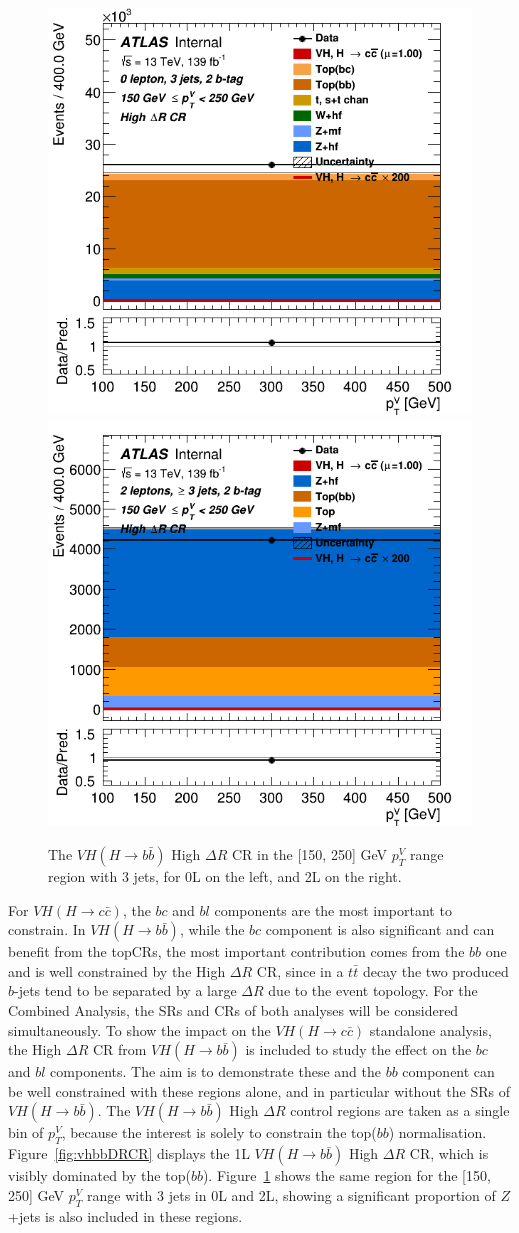 \begin{figure}[h!]
\center
\includegraphics[width=0.48\textwidth25]{Images/VH/SRsandTopCRs/Region_distpTV_DCRHigh_BMax250_L0_Y6051_TTypebb_T2_J3_BMin150_Prefit.png}
\includegraphics[width=0.48\textwidth25]{Images/VH/SRsandTopCRs/Region_distpTV_DCRHigh_BMax250_BMin150_Y6051_TTypebb_T2_J3_L2_incJet1_Prefit.png}
\caption{The $VH(H\rightarrow b\bar{b})$ High $\Delta R$ CR in the [150, 250] GeV $p_T^V$ range region with 3 jets, for 0L on the left, and 2L on the right.} 
\label{fig:vhbbDRCR02L}
\end{figure}

For $VH(H\rightarrow c\bar{c})$, the $bc$ and $bl$ components are the most important to constrain. In $VH(H\rightarrow b\bar{b})$, while the $bc$ component is also significant and can benefit from the topCRs, the most important contribution comes from the $bb$ one and is well constrained by the High $\Delta R$ CR, since in a $t\bar{t}$ decay the two produced $b$-jets tend to be separated by a large $\Delta R$ due to the event topology. For the Combined Analysis, the SRs and CRs of both analyses will be considered simultaneously. To show the impact on the $VH(H\rightarrow c\bar{c})$ standalone analysis, the High $\Delta R$ CR from  $VH(H\rightarrow b\bar{b})$ is included to study the effect on the $bc$ and $bl$ components. The aim is to demonstrate these and the $bb$ component can be well constrained with these regions alone, and in particular without the SRs of $VH(H\rightarrow b\bar{b})$. The $VH(H\rightarrow b\bar{b})$ High $\Delta R$ control regions are taken as a single bin of $p_T^V$, because the interest is solely to constrain the top($bb$) normalisation. Figure~\ref{fig:vhbbDRCR} displays the 1L $VH(H\rightarrow b\bar{b})$ High $\Delta R$ CR, which is visibly dominated by the top($bb$). Figure~\ref{fig:vhbbDRCR02L} shows the same region for the [150, 250] GeV $p_T^V$ range with 3 jets in 0L and 2L, showing a significant proportion of $Z$+jets is also included in these regions.  \\


